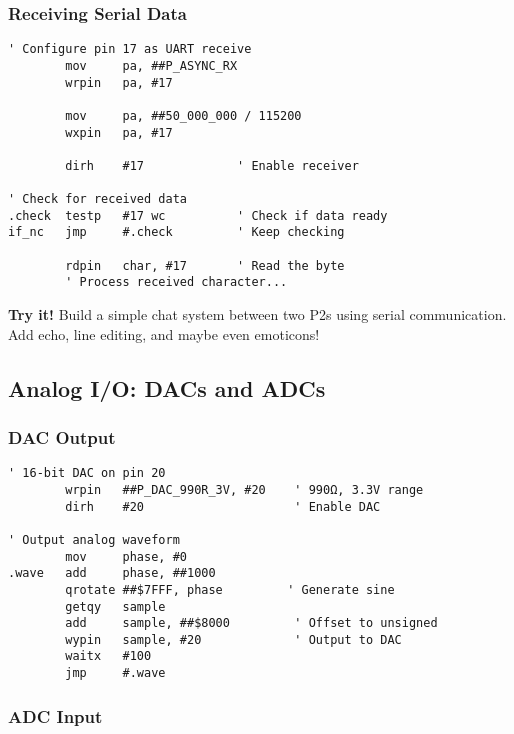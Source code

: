 \documentclass[11pt]{book}
\begin{document}
\hypertarget{receiving-serial-data}{%
\subsubsection{Receiving Serial Data}\label{receiving-serial-data}}

\begin{lstlisting}
' Configure pin 17 as UART receive
        mov     pa, ##P_ASYNC_RX
        wrpin   pa, #17
        
        mov     pa, ##50_000_000 / 115200
        wxpin   pa, #17
        
        dirh    #17             ' Enable receiver
        
' Check for received data
.check  testp   #17 wc          ' Check if data ready
if_nc   jmp     #.check         ' Keep checking
        
        rdpin   char, #17       ' Read the byte
        ' Process received character...
\end{lstlisting}

\textbf{Try it!} Build a simple chat system between two P2s using serial
communication. Add echo, line editing, and maybe even emoticons!

\hypertarget{analog-io-dacs-and-adcs}{%
\subsection{Analog I/O: DACs and ADCs}\label{analog-io-dacs-and-adcs}}

\hypertarget{dac-output}{%
\subsubsection{DAC Output}\label{dac-output}}

\begin{lstlisting}
' 16-bit DAC on pin 20
        wrpin   ##P_DAC_990R_3V, #20    ' 990Ω, 3.3V range
        dirh    #20                     ' Enable DAC
        
' Output analog waveform
        mov     phase, #0
.wave   add     phase, ##1000
        qrotate ##$7FFF, phase         ' Generate sine
        getqy   sample
        add     sample, ##$8000         ' Offset to unsigned
        wypin   sample, #20             ' Output to DAC
        waitx   #100
        jmp     #.wave
\end{lstlisting}

\hypertarget{adc-input}{%
\subsubsection{ADC Input}\label{adc-input}}
\end{document}
